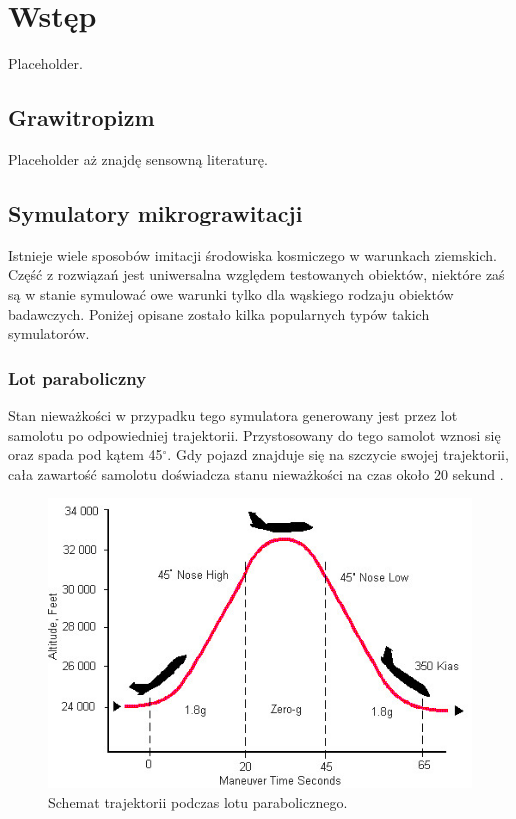 \graphicspath{{./Wstep/images}}

\chapter{Wstęp}

Placeholder.

\section{Grawitropizm}

Placeholder aż znajdę sensowną literaturę.

\section{Symulatory mikrograwitacji}

Istnieje wiele sposobów imitacji środowiska kosmiczego w warunkach ziemskich. Część z rozwiązań jest uniwersalna względem testowanych obiektów, niektóre zaś są w stanie symulować owe warunki tylko dla wąskiego rodzaju obiektów badawczych. Poniżej opisane zostało kilka popularnych typów takich symulatorów.

\subsection{Lot paraboliczny}

Stan nieważkości w przypadku tego symulatora generowany jest przez lot samolotu po odpowiedniej trajektorii. Przystosowany do tego samolot wznosi się oraz spada pod kątem 45$^\circ$. Gdy pojazd znajduje się na szczycie swojej trajektorii, cała zawartość samolotu doświadcza stanu nieważkości na czas około 20 sekund \cite{bib:lot_paraboliczny}. 

\begin{figure}[h]
	
	\centering
	\includegraphics[scale=0.6]{lot_para_sch.jpg}
	\caption{Schemat trajektorii podczas lotu parabolicznego.}
	\label{Lot paraboliczny}
	
\end{figure}

